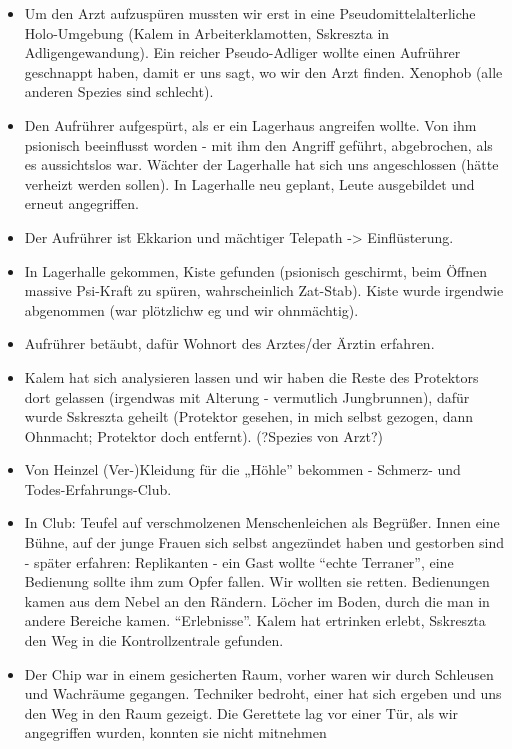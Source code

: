 \documentclass[11pt]{article}
\begin{document}
\begin{itemize}
\item
  Um den Arzt aufzuspüren mussten wir erst in eine
  Pseudomittelalterliche Holo-Umgebung (Kalem in Arbeiterklamotten,
  Sskreszta in Adligengewandung). Ein reicher Pseudo-Adliger wollte
  einen Aufrührer geschnappt haben, damit er uns sagt, wo wir den Arzt
  finden. Xenophob (alle anderen Spezies sind schlecht).
\item
  Den Aufrührer aufgespürt, als er ein Lagerhaus angreifen wollte. Von
  ihm psionisch beeinflusst worden - mit ihm den Angriff geführt,
  abgebrochen, als es aussichtslos war. Wächter der Lagerhalle hat sich
  uns angeschlossen (hätte verheizt werden sollen). In Lagerhalle neu
  geplant, Leute ausgebildet und erneut angegriffen.
\item
  Der Aufrührer ist Ekkarion und mächtiger Telepath -\textgreater{}
  Einflüsterung.
\item
  In Lagerhalle gekommen, Kiste gefunden (psionisch geschirmt, beim
  Öffnen massive Psi-Kraft zu spüren, wahrscheinlich Zat-Stab). Kiste
  wurde irgendwie abgenommen (war plötzlichw eg und wir ohnmächtig).
\item
  Aufrührer betäubt, dafür Wohnort des Arztes/der Ärztin erfahren.
\item
  Kalem hat sich analysieren lassen und wir haben die Reste des
  Protektors dort gelassen (irgendwas mit Alterung - vermutlich
  Jungbrunnen), dafür wurde Sskreszta geheilt (Protektor gesehen, in
  mich selbst gezogen, dann Ohnmacht; Protektor doch entfernt).
  (?Spezies von Arzt?)
\item
  Von Heinzel (Ver-)Kleidung für die „Höhle'' bekommen - Schmerz- und
  Todes-Erfahrungs-Club.
\item
  In Club: Teufel auf verschmolzenen Menschenleichen als Begrüßer. Innen
  eine Bühne, auf der junge Frauen sich selbst angezündet haben und
  gestorben sind - später erfahren: Replikanten - ein Gast wollte
  ``echte Terraner'', eine Bedienung sollte ihm zum Opfer fallen. Wir
  wollten sie retten. Bedienungen kamen aus dem Nebel an den Rändern.
  Löcher im Boden, durch die man in andere Bereiche kamen.
  ``Erlebnisse''. Kalem hat ertrinken erlebt, Sskreszta den Weg in die
  Kontrollzentrale gefunden.
\item
  Der Chip war in einem gesicherten Raum, vorher waren wir durch
  Schleusen und Wachräume gegangen. Techniker bedroht, einer hat sich
  ergeben und uns den Weg in den Raum gezeigt. Die Gerettete lag vor
  einer Tür, als wir angegriffen wurden, konnten sie nicht mitnehmen

\end{itemize}
\end{document}
